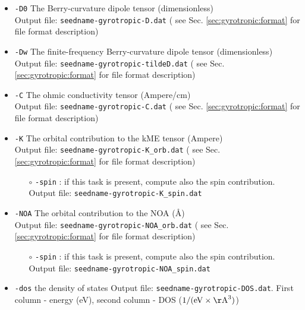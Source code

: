 \begin{itemize}

\item \verb#-D0#  The Berry-curvature dipole tensor  (dimensionless) \\
Output file: {\tt seedname-gyrotropic-D.dat}
( see Sec. \ref{sec:gyrotropic:format} for file format description)

\item \verb#-Dw# The finite-frequency  Berry-curvature dipole tensor  (dimensionless) \\
Output file: {\tt seedname-gyrotropic-tildeD.dat}
( see Sec. \ref{sec:gyrotropic:format} for file format description)


\item \verb#-C# The ohmic conductivity tensor  (Ampere/cm) \\
Output file: {\tt seedname-gyrotropic-C.dat}
( see Sec. \ref{sec:gyrotropic:format} for file format description)

\item \verb#-K# The orbital contribution to the kME tensor  (Ampere) \\
Output file: {\tt seedname-gyrotropic-K\_orb.dat}
( see Sec. \ref{sec:gyrotropic:format} for file format description)
    \begin{itemize}
	\item[$\circ$] \verb#-spin# : if this task is present, compute also the spin contribution.\\
	Output file: {\tt seedname-gyrotropic-K\_spin.dat}
    \end{itemize}

\item \verb#-NOA# The orbital contribution to the NOA  (\AA) \\
Output file: {\tt seedname-gyrotropic-NOA\_orb.dat}
( see Sec. \ref{sec:gyrotropic:format} for file format description)
    \begin{itemize}
	\item[$\circ$] \verb#-spin# : if this task is present, compute also the spin contribution. \\
	Output file: {\tt seedname-gyrotropic-NOA\_spin.dat}
    \end{itemize}

\item \verb#-dos# the density of states
Output file: {\tt seedname-gyrotropic-DOS.dat}. First column - energy (eV), second column - DOS ($1/(\mathrm{eV}\times\mathrm{\AA}^3)$)

\end{itemize}

